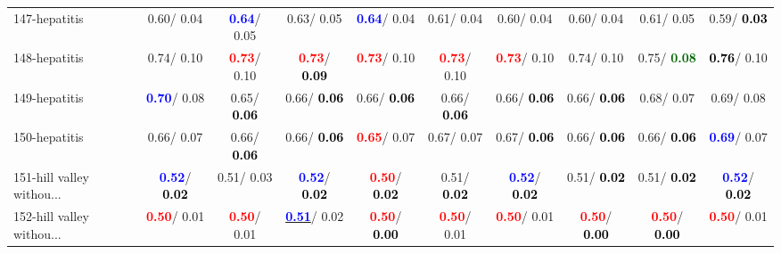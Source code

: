 \begin{table}[h]
\begin{center}
{\begin{tabular}{lc|c|c|c|c|c|c|c|c}
147-hepatitis &   0.60/  0.04 & \textcolor{blue}{\textbf{  0.64}}/  0.05 &   0.63/  0.05 & \textcolor{blue}{\textbf{  0.64}}/  0.04 &   0.61/  0.04 &   0.60/  0.04 &   0.60/  0.04 &   0.61/  0.05 &   0.59/\textcolor{black}{\textbf{  0.03}} \\
148-hepatitis &   0.74/  0.10 & \textcolor{red}{\textbf{  0.73}}/  0.10 & \textcolor{red}{\textbf{  0.73}}/\textcolor{black}{\textbf{  0.09}} & \textcolor{red}{\textbf{  0.73}}/  0.10 & \textcolor{red}{\textbf{  0.73}}/  0.10 & \textcolor{red}{\textbf{  0.73}}/  0.10 &   0.74/  0.10 &   0.75/\textcolor{darkgreen}{\textbf{  0.08}} & \textcolor{black}{\textbf{  0.76}}/  0.10 \\
149-hepatitis & \textcolor{blue}{\textbf{  0.70}}/  0.08 &   0.65/\textcolor{black}{\textbf{  0.06}} &   0.66/\textcolor{black}{\textbf{  0.06}} &   0.66/\textcolor{black}{\textbf{  0.06}} &   0.66/\textcolor{black}{\textbf{  0.06}} &   0.66/\textcolor{black}{\textbf{  0.06}} &   0.66/\textcolor{black}{\textbf{  0.06}} &   0.68/  0.07 &   0.69/  0.08 \\ \hline
150-hepatitis &   0.66/  0.07 &   0.66/\textcolor{black}{\textbf{  0.06}} &   0.66/\textcolor{black}{\textbf{  0.06}} & \textcolor{red}{\textbf{  0.65}}/  0.07 &   0.67/  0.07 &   0.67/\textcolor{black}{\textbf{  0.06}} &   0.66/\textcolor{black}{\textbf{  0.06}} &   0.66/\textcolor{black}{\textbf{  0.06}} & \textcolor{blue}{\textbf{  0.69}}/  0.07 \\
151-hill valley withou... & \textcolor{blue}{\textbf{  0.52}}/\textcolor{black}{\textbf{  0.02}} &   0.51/  0.03 & \textcolor{blue}{\textbf{  0.52}}/\textcolor{black}{\textbf{  0.02}} & \textcolor{red}{\textbf{  0.50}}/\textcolor{black}{\textbf{  0.02}} &   0.51/\textcolor{black}{\textbf{  0.02}} & \textcolor{blue}{\textbf{  0.52}}/\textcolor{black}{\textbf{  0.02}} &   0.51/\textcolor{black}{\textbf{  0.02}} &   0.51/\textcolor{black}{\textbf{  0.02}} & \textcolor{blue}{\textbf{  0.52}}/\textcolor{black}{\textbf{  0.02}} \\
152-hill valley withou... & \textcolor{red}{\textbf{  0.50}}/  0.01 & \textcolor{red}{\textbf{  0.50}}/  0.01 & \underline{\textcolor{blue}{\textbf{  0.51}}}/  0.02 & \textcolor{red}{\textbf{  0.50}}/\textcolor{black}{\textbf{  0.00}} & \textcolor{red}{\textbf{  0.50}}/  0.01 & \textcolor{red}{\textbf{  0.50}}/  0.01 & \textcolor{red}{\textbf{  0.50}}/\textcolor{black}{\textbf{  0.00}} & \textcolor{red}{\textbf{  0.50}}/\textcolor{black}{\textbf{  0.00}} & \textcolor{red}{\textbf{  0.50}}/  0.01 \\

\end{tabular}}
\end{center}
\end{table}
